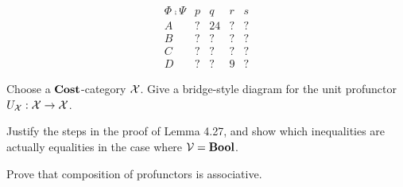 \solution
$$\begin{array}{c|cccc}
\Phi \fcmp \Psi & p & q & r & s \\
\hline A & ? & 24 & ? & ? \\
B & ? & ? & ? & ? \\
C & ? & ? & ? & ? \\
D & ? & ? & 9 & ?
\end{array}$$

Choose a $\textbf{Cost}$-category $\mathcal{X}$.  Give a bridge-style diagram for the unit profunctor $U_{\mathcal{X}}:\mathcal{X}\to\mathcal{X}$.

\solution

Justify the steps in the proof of Lemma 4.27, and show which inequalities are actually equalities in the case where $\mathcal{V}=\textbf{Bool}$.

\solution

Prove that composition of profunctors is associative.

\solution






